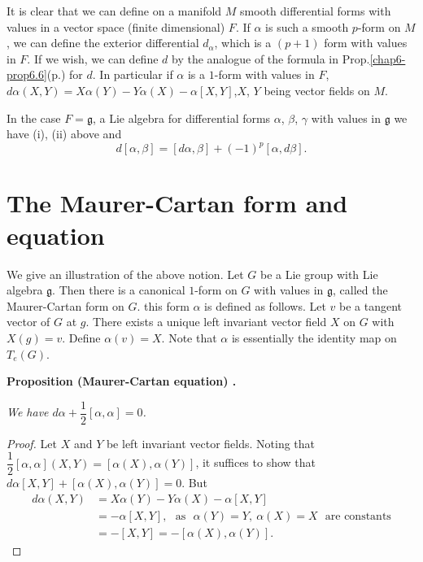 It is clear that we can define on a manifold $M$ smooth differential forms with values in a vector space (finite dimensional) $F$. If $\alpha$ is such a smooth $p$-form on $M$, we can define the exterior differential $d_{\alpha}$, which is a $(p+1)$ form with values in $F$. If we wish, we can define $d$ by the analogue of the formula in Prop.\ref{chap6-prop6.6}(p.\pageref{page30}) for $d$. In particular if $\alpha$ is a $1$-form with values in $F$, $d\alpha(X,Y)=X\alpha(Y)-Y\alpha(X)-\alpha[X,Y]$,\pageoriginale $X$, $Y$ being vector fields on $M$.

In the case $F=\mathfrak{g}$, a Lie algebra for differential forms $\alpha$, $\beta$, $\gamma$ with values in $\mathfrak{g}$ we have (i), (ii) above and 
$$
d[\alpha,\beta]=[d\alpha,\beta]+(-1)^{p}[\alpha,d\beta].
$$

\section*{The Maurer-Cartan form and equation}

We give an illustration of the above notion. Let $G$ be a Lie group with Lie algebra $\mathfrak{g}$. Then there is a canonical $1$-form on $G$ with values in $\mathfrak{g}$, called the Maurer-Cartan form on $G$. this form $\alpha$ is defined as follows. Let $v$ be a tangent vector of $G$ at $g$. There exists a unique left invariant vector field $X$ on $G$ with $X(g)=v$. Define $\alpha(v)=X$. Note that $\alpha$ is essentially the identity map on $T_{e}(G)$.

\medskip

\noindent
{\bf Proposition (Maurer-Cartan equation) .\label{chap11-prop11.3}}

{\em We have $d\alpha+\dfrac{1}{2}[\alpha,\alpha]=0$.}

\begin{proof}
Let $X$ and $Y$ be left invariant vector fields. Noting that $\dfrac{1}{2}[\alpha,\alpha](X,Y)=[\alpha(X),\alpha(Y)]$, it suffices to show that $d\alpha[X,Y]+[\alpha(X),\alpha(Y)]=0$. But
\begin{align*}
d\alpha(X,Y) &= X\alpha(Y)-Y\alpha(X)-\alpha[X,Y]\\[3pt]
             &= -\alpha[X,Y],\text{~ as~ }\alpha(Y)=Y, \ \alpha(X)=X\text{~ are constants}\\[3pt]
             &= -[X,Y]=-[\alpha(X),\alpha(Y)].
\end{align*}
\end{proof}

